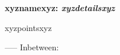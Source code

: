 \textbf{xyznamexyz: \textit{xyzdetailsxyz}}
\begin{itemize}
    xyzpointsxyz
\end{itemize}
-----
Inbetween: \vspace{0pt}